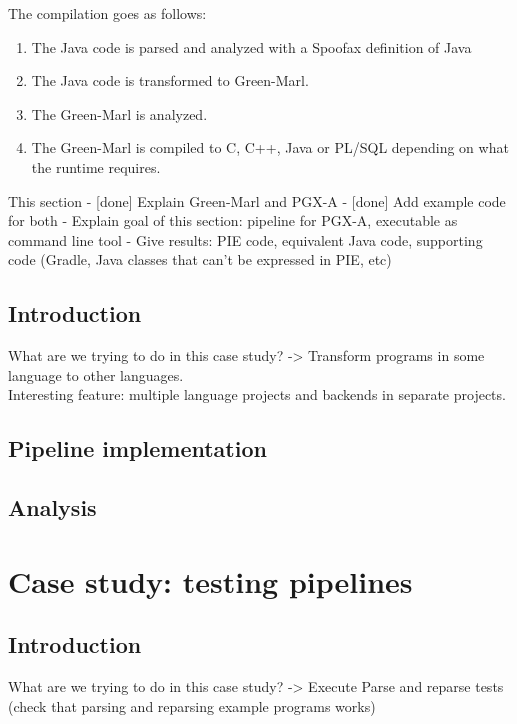 The compilation goes as follows:
\begin{enumerate}
  \item The Java code is parsed and analyzed with a Spoofax definition of Java
  \item The Java code is transformed to Green-Marl.
  \item The Green-Marl is analyzed.
  \item The Green-Marl is compiled to C, C++, Java or \ac{PL/SQL} depending on what the runtime requires.
\end{enumerate}

This section
- [done] Explain Green-Marl and PGX-A
- [done] Add example code for both
- Explain goal of this section: pipeline for PGX-A, executable as command line tool
- Give results: PIE code, equivalent Java code, supporting code (Gradle, Java classes that can't be expressed in PIE, etc)

\subsection{Introduction}
\label{sec:evaluation__database__introduction}
What are we trying to do in this case study?
-> Transform programs in some language to other languages.
\\
Interesting feature: multiple language projects and backends in separate projects.


\subsection{Pipeline implementation}
\label{sec:evaluation__database__implementation}


\subsection{Analysis}
\label{sec:evaluation__database__analysis}


\section{Case study: testing pipelines}
\label{sec:evaluation__testing}

\subsection{Introduction}
\label{sec:evaluation__testing__introduction}
What are we trying to do in this case study?
-> Execute Parse and reparse tests (check that parsing and reparsing example programs works)

